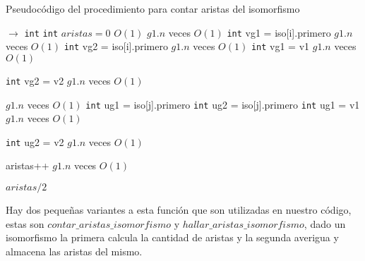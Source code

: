 \begin{algorithm}[H]
  \begin{algorithmic}[1]
  \caption{Pseudocódigo del procedimiento para contar aristas del isomorfismo}
  \label{algo:ap-3}
     $\rightarrow$ \texttt{int}
    \State \texttt{int} $aristas = 0$
    \Comment $O(1)$
        \Comment $g1.n$ veces $O(1)$
		\State \texttt{int} vg1 = iso[i].primero
		\Comment $g1.n$ veces $O(1)$
		\State \texttt{int} vg2 = iso[i].primero
		\Comment $g1.n$ veces $O(1)$
		 \Else
		 \State \texttt{int} vg1 = v1
		\Comment $g1.n$ veces $O(1)$

		 \State \texttt{int} vg2 = v2
		\Comment $g1.n$ veces $O(1)$

		 \EndIf 


        \Comment $g1.n$ veces $O(1)$
		\State \texttt{int} ug1 = iso[j].primero
		\State \texttt{int} ug2 = iso[j].primero
		 \Else
		 \State \texttt{int} ug1 = v1
		\Comment $g1.n$ veces $O(1)$

		 \State \texttt{int} ug2 = v2
		\Comment $g1.n$ veces $O(1)$

		 \EndIf 
		\State aristas++
		\Comment $g1.n$ veces $O(1)$
		\EndIf
	    \EndFor

    \EndFor
    \Return $aristas/2$

		\EndProcedure
	\end{algorithmic}
\end{algorithm}

Hay dos pequeñas variantes a esta función que son utilizadas en nuestro código, estas son $contar\_aristas\_isomorfismo$ y $hallar\_aristas\_isomorfismo$, dado un isomorfismo la primera calcula la cantidad de aristas y la segunda averigua y almacena las aristas del mismo.